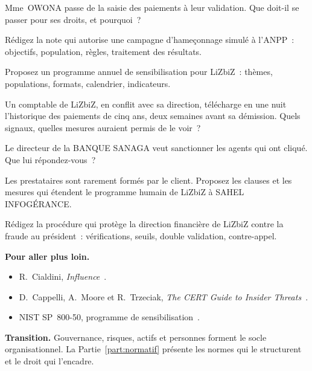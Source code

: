 \begin{boxexo}[title={\ding{45}\quad Exercice~9.4. Changement de poste \niveaumoyen}]
Mme~OWONA passe de la saisie des paiements à leur validation. Que doit-il
se passer pour ses droits, et pourquoi~?
\end{boxexo}

\begin{boxexo}[title={\ding{45}\quad Exercice~9.5. Le cadre \niveaumoyen}]
Rédigez la note qui autorise une campagne d'hameçonnage simulé à l'ANPP~:
objectifs, population, règles, traitement des résultats.
\end{boxexo}

\begin{boxexo}[title={\ding{45}\quad Exercice~9.6. Programme \niveaumoyen}]
Proposez un programme annuel de sensibilisation pour LiZbiZ~: thèmes,
populations, formats, calendrier, indicateurs.
\end{boxexo}

\begin{boxexo}[title={\ding{45}\quad Exercice~9.7. Signaux \niveaumoyen}]
Un comptable de LiZbiZ, en conflit avec sa direction, télécharge en une
nuit l'historique des paiements de cinq ans, deux semaines avant sa
démission. Quels signaux, quelles mesures auraient permis de le voir~?
\end{boxexo}

\begin{boxexo}[title={\ding{45}\quad Exercice~9.8. Sanctionner~? \niveaumoyen}]
Le directeur de la BANQUE SANAGA veut sanctionner les agents qui ont
cliqué. Que lui répondez-vous~?
\end{boxexo}

\begin{boxexo}[title={\ding{45}\quad Exercice~9.9. Le prestataire \niveauexpert}]
Les prestataires sont rarement formés par le client. Proposez les clauses
et les mesures qui étendent le programme humain de LiZbiZ à SAHEL
INFOGÉRANCE.
\end{boxexo}

\begin{boxexo}[title={\ding{45}\quad Exercice~9.10. Fraude au président \niveauexpert}]
Rédigez la procédure qui protège la direction financière de LiZbiZ
contre la fraude au président~: vérifications, seuils, double validation,
contre-appel.
\end{boxexo}

\bigskip

\begin{boxinfo}
\textbf{Pour aller plus loin.}
\begin{itemize}
    \item R.~Cialdini, \emph{Influence}~\cite{cialdini1984}.
    \item D.~Cappelli, A.~Moore et R.~Trzeciak, \emph{The CERT Guide to
          Insider Threats}~\cite{cappelli2012}.
    \item NIST SP~800-50, programme de sensibilisation~\cite{nist80050}.
\end{itemize}
\end{boxinfo}

\begin{boxinfo}
\textbf{Transition.} Gouvernance, risques, actifs et personnes forment le
socle organisationnel. La Partie~\ref{part:normatif} présente les normes
qui le structurent et le droit qui l'encadre.
\end{boxinfo}
